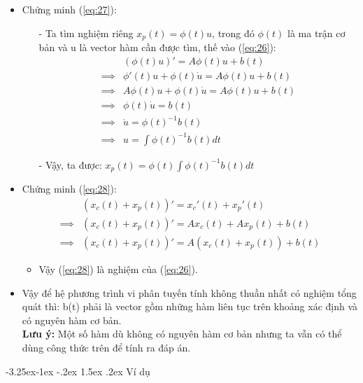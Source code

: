 \documentclass[a4paper]{article}
\makeatletter
\newcounter {subsubsubsection}[subsubsection]
\newcommand\subsubsubsection{\@startsection{subsubsubsection}{4}{\z@}%
                                     {-3.25ex\@plus -1ex \@minus -.2ex}%
                                     {1.5ex \@plus .2ex}%
                                     {\normalfont\normalsize\bfseries}}
\makeatother
\begin{document}
\begin{itemize}
\item Chứng minh (\ref{eq:27}):
    \begin{itemize} 
    \item[-] Ta tìm nghiệm riêng $x_p(t) = \phi(t)u$, trong đó $\phi(t)$ là ma trận cơ bản và u là vector hàm cần được tìm, thế vào (\ref{eq:26}):
        \begin{equation*}
            \begin{split}
                &(\phi(t)u)' = A\phi(t)u + b(t)\\
                \implies &\phi'(t)u + \phi(t)\dot{u} = A\phi(t)u + b(t)\\
                \implies &A\phi(t)u + \phi(t)\dot{u} = A\phi(t)u + b(t)\\
                \implies &\phi(t)\dot{u} = b(t)\\
                \implies &\dot{u} = \phi(t)^{-1}b(t) \\
                \implies &u = \int\phi(t)^{-1}b(t)dt
            \end{split}
        \end{equation*}
    \item[-] Vậy, ta được: $x_p(t) = \phi(t)\int\phi(t)^{-1}b(t)dt$
    \end{itemize}
\item Chứng minh (\ref{eq:28}):
    \begin{equation*}
        \begin{split}
            &(x_c(t) + x_p(t))' = x_c'(t) + x_p'(t)\\
            \implies &(x_c(t) + x_p(t))' = Ax_c(t) + Ax_p(t) + b(t)\\
            \implies &(x_c(t) + x_p(t))' = A(x_c(t) + x_p(t)) + b(t)
        \end{split}
    \end{equation*}
    \begin{itemize}
    \item Vậy (\ref{eq:28}) là nghiệm của (\ref{eq:26}).
    \end{itemize}
\item Vậy để hệ phương trình vi phân tuyến tính không thuần nhất có nghiệm tổng quát thì: b(t) phải là vector gồm những hàm liên tục trên khoảng xác định và có nguyên hàm cơ bản. \\
\textbf{Lưu ý:} Một số hàm dù không có nguyên hàm cơ bản nhưng ta vẫn có thể dùng công thức trên để tính ra đáp án.
\end{itemize}
\subsubsubsection{Ví dụ}
\end{document}
